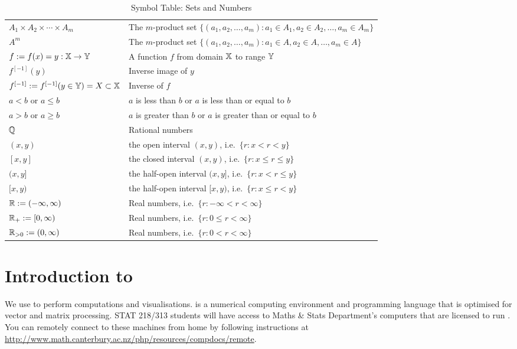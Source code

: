 \begin{table}[htb]
{\begin{tabular}{| l | l |}
$A_1 \times A_2 \times \cdots \times A_m$ & The $m$-product set $\{(a_1,a_2,\ldots,a_{m}): a_1 \in A_1, a_2 \in A_2, \ldots, a_{m} \in A_m \}$ \\
$A^m$ & The $m$-product set $\{(a_1,a_2,\ldots,a_{m}): a_1 \in A, a_2 \in A, \ldots, a_{m} \in A \}$ \\
$f := f(x)=y:\mathbb{X} \to \mathbb{Y}$ & A function $f$ from domain $\mathbb{X}$ to range $\mathbb{Y}$ \\
$f^{[-1]}(y)$ & Inverse image of $y$ \\
$f^{[-1]} := f^{[-1]}(y \in \mathbb{Y}) = X \subset \mathbb{X}$ & Inverse of $f$ \\
$a<b$ or $a \leq b$ & $a$ is less than $b$ or $a$ is less than or equal to $b$ \\
$a>b$ or $a \geq b$ & $a$ is greater than $b$ or $a$ is greater than or equal to $b$ \\
$\mathbb{Q}$ & Rational numbers \\
$(x,y)$ & the open interval $(x,y)$, i.e.~$\{r: x < r < y\}$ \\
$[x,y]$ & the closed interval $(x,y)$, i.e.~$\{r: x \leq r \leq y\}$ \\
$(x,y]$ & the half-open interval $(x,y]$, i.e.~$\{r: x < r \leq y\}$ \\
$[x,y)$ & the half-open interval $[x,y)$, i.e.~$\{r: x \leq r < y\}$ \\
$\mathbb{R} := (-\infty,\infty)$ & Real numbers, i.e.~$\{r: -\infty < r <  \infty \}$ \\
$\mathbb{R}_+ := [0,\infty)$ & Real numbers, i.e.~$\{r: 0 \leq r <  \infty \}$ \\
$\mathbb{R}_{>0} := (0,\infty)$ & Real numbers, i.e.~$\{r: 0 < r <  \infty \}$ \\
\hline
\end{tabular}
}
\caption{Symbol Table: Sets and Numbers \label{T:SymbTableSets}}
\end{table}

\clearpage

\section{Introduction to \Matlab}\label{S:IntroMatlab}
We use \Matlab to perform computations and visualisations. \Matlab is a numerical computing environment and programming language that is optimised for vector and matrix processing.  STAT 218/313 students will have access to Maths \& Stats Department's computers that are licensed to run \Matlab.  You can remotely connect to these machines from home by following instructions at \href{http://www.math.canterbury.ac.nz/php/resources/compdocs/remote}{\url{http://www.math.canterbury.ac.nz/php/resources/compdocs/remote}}.

